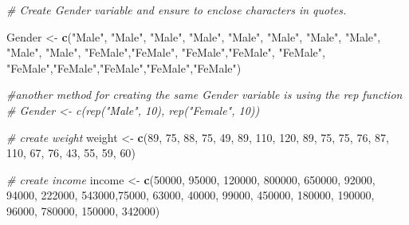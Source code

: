 \documentclass[
]{article}
\newenvironment{Shaded}{\begin{snugshade}}{\end{snugshade}}
\newcommand{\CommentTok}[1]{\textcolor[rgb]{0.56,0.35,0.01}{\textit{#1}}}
\newcommand{\DecValTok}[1]{\textcolor[rgb]{0.00,0.00,0.81}{#1}}
\newcommand{\FunctionTok}[1]{\textcolor[rgb]{0.13,0.29,0.53}{\textbf{#1}}}
\newcommand{\NormalTok}[1]{#1}
\newcommand{\OtherTok}[1]{\textcolor[rgb]{0.56,0.35,0.01}{#1}}
\newcommand{\StringTok}[1]{\textcolor[rgb]{0.31,0.60,0.02}{#1}}
\begin{document}
\begin{Shaded}
\begin{Highlighting}[]
\CommentTok{\# Create Gender variable and ensure to enclose characters in quotes.}

\NormalTok{Gender }\OtherTok{\textless{}{-}} \FunctionTok{c}\NormalTok{(}\StringTok{"Male"}\NormalTok{, }\StringTok{"Male"}\NormalTok{, }\StringTok{"Male"}\NormalTok{, }\StringTok{"Male"}\NormalTok{, }\StringTok{"Male"}\NormalTok{, }
            \StringTok{"Male"}\NormalTok{, }\StringTok{"Male"}\NormalTok{, }\StringTok{"Male"}\NormalTok{, }\StringTok{"Male"}\NormalTok{, }\StringTok{"Male"}\NormalTok{, }
            \StringTok{"FeMale"}\NormalTok{,}\StringTok{"FeMale"}\NormalTok{, }\StringTok{"FeMale"}\NormalTok{,}\StringTok{"FeMale"}\NormalTok{, }\StringTok{"FeMale"}\NormalTok{,}
           \StringTok{"FeMale"}\NormalTok{,}\StringTok{"FeMale"}\NormalTok{,}\StringTok{"FeMale"}\NormalTok{,}\StringTok{"FeMale"}\NormalTok{,}\StringTok{"FeMale"}\NormalTok{)}

\CommentTok{\#another method for creating the same Gender variable  is using the \textasciigrave{}rep\textasciigrave{} function}
\CommentTok{\# Gender \textless{}{-} c(rep("Male", 10), rep("Female", 10))}

\CommentTok{\# create weight}
\NormalTok{weight }\OtherTok{\textless{}{-}} \FunctionTok{c}\NormalTok{(}\DecValTok{89}\NormalTok{, }\DecValTok{75}\NormalTok{, }\DecValTok{88}\NormalTok{, }\DecValTok{75}\NormalTok{, }\DecValTok{49}\NormalTok{, }\DecValTok{89}\NormalTok{, }\DecValTok{110}\NormalTok{, }\DecValTok{120}\NormalTok{, }\DecValTok{89}\NormalTok{, }\DecValTok{75}\NormalTok{, }
            \DecValTok{75}\NormalTok{, }\DecValTok{76}\NormalTok{, }\DecValTok{87}\NormalTok{, }\DecValTok{110}\NormalTok{, }\DecValTok{67}\NormalTok{, }\DecValTok{76}\NormalTok{, }\DecValTok{43}\NormalTok{, }\DecValTok{55}\NormalTok{, }\DecValTok{59}\NormalTok{, }\DecValTok{60}\NormalTok{) }

\CommentTok{\# create income}
\NormalTok{income }\OtherTok{\textless{}{-}} \FunctionTok{c}\NormalTok{(}\DecValTok{50000}\NormalTok{, }\DecValTok{95000}\NormalTok{, }\DecValTok{120000}\NormalTok{, }\DecValTok{800000}\NormalTok{, }\DecValTok{650000}\NormalTok{, }\DecValTok{92000}\NormalTok{, }\DecValTok{94000}\NormalTok{, }\DecValTok{222000}\NormalTok{, }\DecValTok{543000}\NormalTok{,}\DecValTok{75000}\NormalTok{,}
            \DecValTok{63000}\NormalTok{, }\DecValTok{40000}\NormalTok{, }\DecValTok{99000}\NormalTok{, }\DecValTok{450000}\NormalTok{, }\DecValTok{180000}\NormalTok{, }\DecValTok{190000}\NormalTok{, }\DecValTok{96000}\NormalTok{, }\DecValTok{780000}\NormalTok{, }\DecValTok{150000}\NormalTok{, }\DecValTok{342000}\NormalTok{)}


\end{Highlighting}
\end{Shaded}
\end{document}
